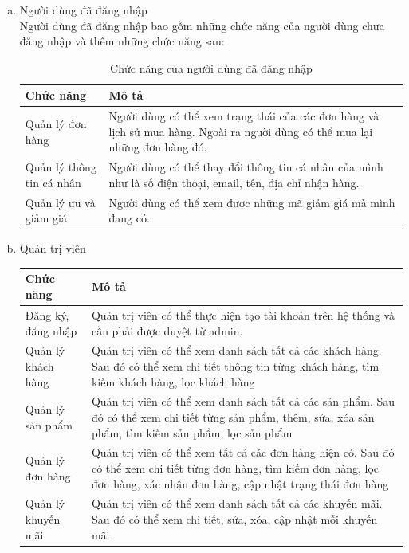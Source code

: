 \begin{enumerate}[a. ]
        \item Người dùng đã đăng nhập\\
        Người dùng đã đăng nhập bao gồm những chức năng của người dùng chưa đăng nhập và thêm những chức năng sau:
        \begin{table}[h]
        \centering
        \begin{tabular}{|p{5cm}|p{10cm}|}
        \hline
        Chức năng & Mô tả \\
        \hline
        Quản lý đơn hàng & Người dùng có thể xem trạng thái của các đơn hàng và lịch sử mua hàng. Ngoài ra người dùng có thể mua lại những đơn hàng đó.\\
        \hline
        Quản lý thông tin cá nhân & Người dùng có thể thay đổi thông tin cá nhân của mình như là số điện thoại, email, tên, địa chỉ nhận hàng.\\
        \hline
        Quản lý ưu  và giảm giá & Người dùng có thể xem được những mã giảm giá mà mình đang có.\\
        \hline
        \end{tabular}
    \caption{Chức năng của người dùng đã đăng nhập}
    \end{table}
    \newpage
    \item Quản trị viên\\
    \begin{table}[h]
        \centering
    \begin{tabular}{|p{5cm}|p{10cm}|}
        \hline
      Chức năng & Mô tả  \\
         \hline
         Đăng ký, đăng nhập& Quản trị viên có thể thực hiện tạo tài khoản trên hệ thống và cần phải được duyệt từ admin.\\
         \hline
        Quản lý khách hàng & Quản trị viên có thể xem danh sách tất cả các khách hàng. Sau đó có thể xem chi tiết thông tin từng khách hàng, tìm kiếm khách hàng, lọc khách hàng \\
         \hline
         Quản lý sản phẩm& Quản trị viên có thể xem danh sách tất cả các sản phẩm. Sau đó có thể xem chi tiết từng sản phẩm, thêm, sửa, xóa sản phẩm, tìm kiếm sản phẩm, lọc sản phẩm \\
         \hline 
          Quản lý đơn hàng& Quản trị viên có thể xem tất cả các đơn hàng hiện có. Sau đó có thể xem chi tiết từng đơn hàng, tìm kiếm đơn hàng, lọc đơn hàng, xác nhận đơn hàng, cập nhật trạng thái đơn hàng \\
         \hline 
          Quản lý khuyến mãi& Quản trị viên có thể xem danh sách tất cả các khuyến mãi. Sau đó có thể xem chi tiết, sửa, xóa, cập nhật mỗi khuyến mãi  \\

\end{tabular}
\end{table}
\end{enumerate}
